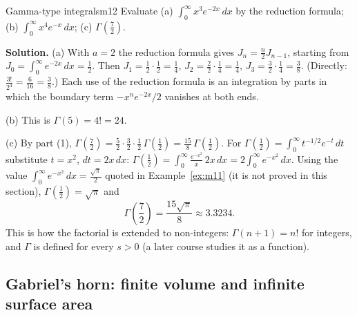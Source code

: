 \documentclass[11pt]{article}
\begin{document}
\begin{exmp}{Gamma-type integrals}{m12}
Evaluate (a) $\displaystyle\int_0^\infty x^3e^{-2x}\,dx$ by the reduction formula; (b) $\displaystyle\int_0^\infty x^4e^{-x}\,dx$; (c) $\Gamma\left(\frac72\right)$.

\textbf{Solution.} (a) With $a=2$ the reduction formula gives $J_n=\frac n2J_{n-1}$, starting from $J_0=\int_0^\infty e^{-2x}\,dx=\frac12$. Then $J_1=\frac12\cdot\frac12=\frac14$, $J_2=\frac22\cdot\frac14=\frac14$, $J_3=\frac32\cdot\frac14=\frac38$. (Directly: $\frac{3!}{2^4}=\frac6{16}=\frac38$.) Each use of the reduction formula is an integration by parts in which the boundary term $-x^ne^{-2x}\big/2$ vanishes at both ends.

(b) This is $\Gamma(5)=4!=24$.

(c) By part (1), $\Gamma\left(\frac72\right)=\frac52\cdot\frac32\cdot\frac12\,\Gamma\left(\frac12\right)=\frac{15}8\,\Gamma\left(\frac12\right)$. For $\Gamma\left(\frac12\right)=\int_0^\infty t^{-1/2}e^{-t}\,dt$ substitute $t=x^2$, $dt=2x\,dx$: $\Gamma\left(\frac12\right)=\int_0^\infty\frac{e^{-x^2}}x\,2x\,dx=2\int_0^\infty e^{-x^2}\,dx$. Using the value $\int_0^\infty e^{-x^2}\,dx=\frac{\sqrt\pi}2$ quoted in Example~\ref{ex:m11} (it is not proved in this section), $\Gamma\left(\frac12\right)=\sqrt\pi$ and
\[\Gamma\left(\frac72\right)=\frac{15\sqrt\pi}8\approx3.3234 .\]
This is how the factorial is extended to non-integers: $\Gamma(n+1)=n!$ for integers, and $\Gamma$ is defined for every $s>0$ (a later course studies it as a function).
\end{exmp}

\subsection*{Gabriel's horn: finite volume and infinite surface area}
\end{document}
